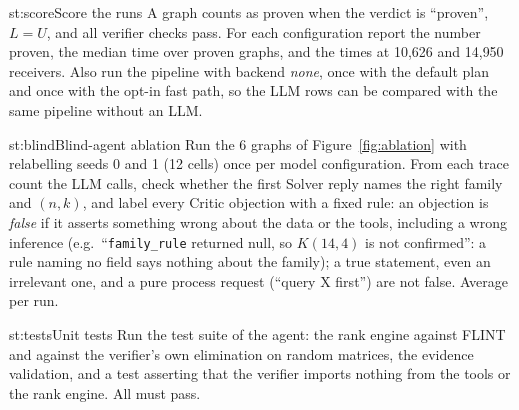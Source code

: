 \begin{step}{st:score}{Score the runs}
A graph counts as proven when the verdict is ``proven'', $L=U$, and all verifier checks pass. For each configuration
report the number proven, the median time over proven graphs, and the times at 10{,}626 and 14{,}950 receivers.
Also run the pipeline with backend \emph{none}, once with the default plan and once with the opt-in fast path, so the
LLM rows can be compared with the same pipeline without an LLM.
\end{step}

\begin{step}{st:blind}{Blind-agent ablation}
Run the 6 graphs of Figure~\ref{fig:ablation} with relabelling seeds 0 and 1 (12 cells) once per model
configuration. From each trace count the LLM calls, check whether the first Solver reply names the right family and
$(n,k)$, and label every Critic objection with a fixed rule: an objection is \emph{false} if it asserts something
wrong about the data or the tools, including a wrong inference (e.g.\ ``\texttt{family\_rule} returned null, so
$K(14,4)$ is not confirmed'': a rule naming no field says nothing about the family); a true statement, even an
irrelevant one, and a pure process request (``query X first'') are not false. Average per run.
\end{step}

\begin{step}{st:tests}{Unit tests}
Run the test suite of the agent: the rank engine against FLINT and against the verifier's own elimination on random
matrices, the evidence validation, and a test asserting that the verifier imports nothing from the tools or the rank
engine. All must pass.
\end{step}

